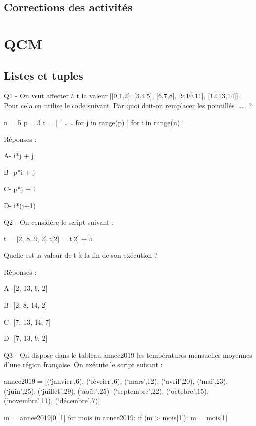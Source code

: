 \documentclass[
]{book}
\begin{document}
\hypertarget{corrections-des-activituxe9s-1}{%
\section{Corrections des activités}\label{corrections-des-activituxe9s-1}}

\hypertarget{qcm}{%
\chapter{QCM}\label{qcm}}

\hypertarget{listes-et-tuples-1}{%
\section{Listes et tuples}\label{listes-et-tuples-1}}

Q1 - On veut affecter à t la valeur {[}{[}0,1,2{]}, {[}3,4,5{]}, {[}6,7,8{]}, {[}9,10,11{]}, {[}12,13,14{]}{]}. Pour cela on utilise le code suivant. Par quoi doit-on remplacer les pointillés \ldots\ldots{} ?

n = 5
p = 3
t = {[} {[} \ldots\ldots{} for j in range(p) {]} for i in range(n) {]}

Réponses :

A- i*j + j

B- p*i + j

C- p*j + i

D- i*(j+1)

Q2 - On considère le script suivant :

t = {[}2, 8, 9, 2{]}
t{[}2{]} = t{[}2{]} + 5

Quelle est la valeur de t à la fin de son exécution ?

Réponses :

A- {[}2, 13, 9, 2{]}

B- {[}2, 8, 14, 2{]}

C- {[}7, 13, 14, 7{]}

D- {[}7, 13, 9, 2{]}

Q3 - On dispose dans le tableau annee2019 les températures mensuelles moyennes d'une région française. On exécute le script suivant :

annee2019 = {[}(`janvier',6), (`février',6), (`mars',12),
(`avril',20), (`mai',23), (`juin',25),
(`juillet',29), (`août',25), (`septembre',22),
(`octobre',15), (`novembre',11), (`décembre',7){]}

m = annee2019{[}0{]}{[}1{]}
for mois in annee2019:
if (m \textgreater{} mois{[}1{]}):
m = mois{[}1{]}
\end{document}
